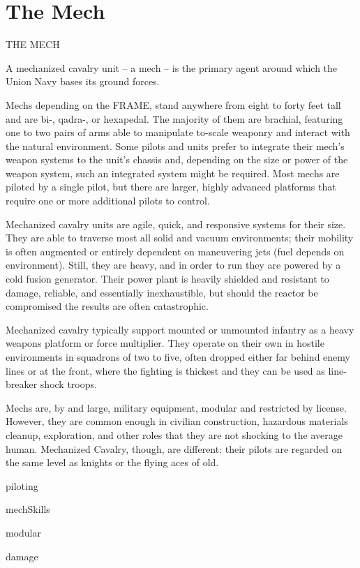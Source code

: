 \chapter{The Mech}

THE MECH

A mechanized cavalry unit -- a mech -- is the primary agent around which the Union Navy
bases its ground forces.

Mechs depending on the FRAME, stand anywhere from eight to forty feet tall and are bi-, qadra-,
or hexapedal. The majority of them are brachial, featuring one to two pairs of arms able to
manipulate to-scale weaponry and interact with the natural environment. Some pilots and units
prefer to integrate their mech’s weapon systems to the unit’s chassis and, depending on the size
or power of the weapon system, such an integrated system might be required. Most mechs are
piloted by a single pilot, but there are larger, highly advanced platforms that require one or more
additional pilots to control.


Mechanized cavalry units are agile, quick, and responsive systems for their size. They are able to
traverse most all solid and vacuum environments; their mobility is often augmented or entirely
dependent on maneuvering jets (fuel depends on environment). Still, they are heavy, and in order
to run they are powered by a cold fusion generator. Their power plant is heavily shielded and
resistant to damage, reliable, and essentially inexhaustible, but should the reactor be
compromised the results are often catastrophic.


Mechanized cavalry typically support mounted or unmounted infantry as a heavy weapons
platform or force multiplier. They operate on their own in hostile environments in squadrons of
two to five, often dropped either far behind enemy lines or at the front, where the fighting is
thickest and they can be used as line-breaker shock troops.


Mechs are, by and large, military equipment, modular and restricted by license. However, they
are common enough in civilian construction, hazardous materials cleanup, exploration, and other
roles that they are not shocking to the average human. Mechanized Cavalry, though, are
different: their pilots are regarded on the same level as knights or the flying aces of old.

{piloting}

{mechSkills}

{modular}

{damage}

